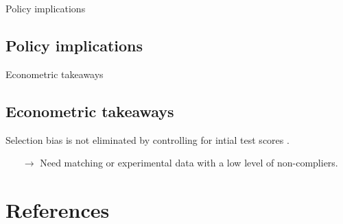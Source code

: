 \documentclass[9pt]{beamer}
\numberwithin{equation}{section}
\begin{document}
\begin{frame}{Policy implications}
  \subsection{Policy implications}
\end{frame}


\begin{frame}{Econometric takeaways}
  \subsection{Econometric takeaways}
Selection bias is not eliminated by controlling for intial test scores \citep{manning2006comprehensive}.
\begin{itemize}
  \item[$\rightarrow$] Need matching or experimental data with a low level of non-compliers.
\end{itemize}
\end{frame}


\section{References}

\begin{frame}%
  \printbibliography
\end{frame}

\end{document}
